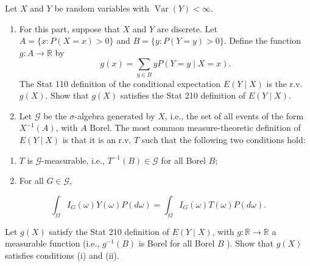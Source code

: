 \documentclass[
  letterpaper,
  DIV=11,
  numbers=noendperiod]{scrreprt}
\theoremstyle{plain}
\theoremstyle{definition}
\theoremstyle{remark}
\begin{document}
Let \(X\) and \(Y\) be random variables with
\(\operatorname{Var}(Y)<\infty\).

\begin{enumerate}
\def\labelenumi{(\alph{enumi})}
\item
  For this part, suppose that \(X\) and \(Y\) are discrete. Let
  \(A=\{x: P(X=x)>0\}\) and \(B=\{y: P(Y=y)>0\}\). Define the function
  \(g: A \rightarrow \mathbb{R}\) by \[
  g(x)=\sum_{y \in B} y P(Y=y \mid X=x) .
  \] The Stat 110 definition of the conditional expectation
  \(E(Y \mid X)\) is the r.v. \(g(X)\). Show that \(g(X)\) satisfies the
  Stat 210 definition of \(E(Y \mid X)\).
\item
  Let \(\mathcal{G}\) be the \(\sigma\)-algebra generated by \(X\),
  i.e., the set of all events of the form \(X^{-1}(A)\), with \(A\)
  Borel. The most common measure-theoretic definition of \(E(Y \mid X)\)
  is that it is an r.v. \(T\) such that the following two conditions
  hold:
\end{enumerate}

\begin{enumerate}
\def\labelenumi{\roman{enumi}.}
\item
  \(T\) is \(\mathcal{G}\)-measurable, i.e.,
  \(T^{-1}(B) \in \mathcal{G}\) for all Borel \(B\);
\item
  For all \(G \in \mathcal{G}\),
\end{enumerate}

\[
\int_{\Omega} I_G(\omega) Y(\omega) P(d \omega)=\int_{\Omega} I_G(\omega) T(\omega) P(d \omega) .
\]

Let \(g(X)\) satisfy the Stat 210 definition of \(E(Y \mid X)\), with
\(g: \mathbb{R} \rightarrow \mathbb{R}\) a measurable function (i.e.,
\(g^{-1}(B)\) is Borel for all Borel \(B\) ). Show that \(g(X)\)
satisfies conditions (i) and (ii).
\end{document}
